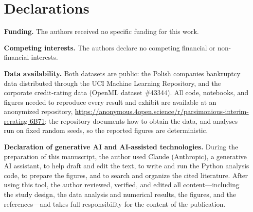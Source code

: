 \documentclass[pdflatex,sn-mathphys-ay]{sn-jnl}
\begin{document}
\backmatter


\section*{Declarations}

\noindent\textbf{Funding.} The authors received no specific funding for this work.

\medskip
\noindent\textbf{Competing interests.} The authors declare no competing financial or non-financial
interests.

\medskip
\noindent\textbf{Data availability.} Both datasets are public: the Polish companies bankruptcy data
\citep{zieba2016} distributed through the UCI Machine Learning Repository, and the corporate
credit-rating data (OpenML dataset \#43344). All code, notebooks, and figures needed to reproduce every
result and exhibit are available at an anonymized repository,
\url{https://anonymous.4open.science/r/parsimonious-interim-rerating-6B71}; the repository documents
how to obtain the data, and analyses run on fixed random seeds, so the reported figures are
deterministic.

\medskip
\noindent\textbf{Declaration of generative AI and AI-assisted technologies.} During the preparation of
this manuscript, the author used Claude (Anthropic), a generative AI assistant, to help draft and edit
the text, to write and run the Python analysis code, to prepare the figures, and to search and organize
the cited literature. After using this tool, the author reviewed, verified, and edited all
content---including the study design, the data analysis and numerical results, the figures, and the
references---and takes full responsibility for the content of the publication.
\end{document}
